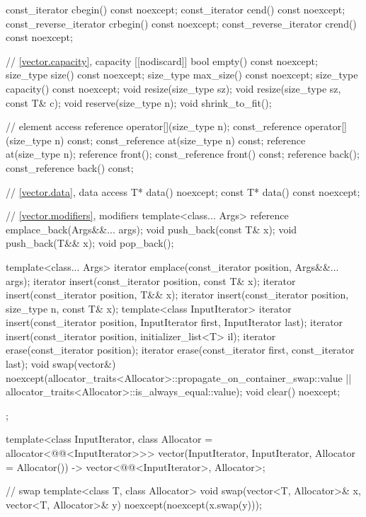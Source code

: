 \begin{codeblock}
{{    const_iterator         cbegin() const noexcept;
    const_iterator         cend() const noexcept;
    const_reverse_iterator crbegin() const noexcept;
    const_reverse_iterator crend() const noexcept;

    // \ref{vector.capacity}, capacity
    [[nodiscard]] bool empty() const noexcept;
    size_type size() const noexcept;
    size_type max_size() const noexcept;
    size_type capacity() const noexcept;
    void      resize(size_type sz);
    void      resize(size_type sz, const T& c);
    void      reserve(size_type n);
    void      shrink_to_fit();

    // element access
    reference       operator[](size_type n);
    const_reference operator[](size_type n) const;
    const_reference at(size_type n) const;
    reference       at(size_type n);
    reference       front();
    const_reference front() const;
    reference       back();
    const_reference back() const;

    // \ref{vector.data}, data access
    T*       data() noexcept;
    const T* data() const noexcept;

    // \ref{vector.modifiers}, modifiers
    template<class... Args> reference emplace_back(Args&&... args);
    void push_back(const T& x);
    void push_back(T&& x);
    void pop_back();

    template<class... Args> iterator emplace(const_iterator position, Args&&... args);
    iterator insert(const_iterator position, const T& x);
    iterator insert(const_iterator position, T&& x);
    iterator insert(const_iterator position, size_type n, const T& x);
    template<class InputIterator>
      iterator insert(const_iterator position, InputIterator first, InputIterator last);
    iterator insert(const_iterator position, initializer_list<T> il);
    iterator erase(const_iterator position);
    iterator erase(const_iterator first, const_iterator last);
    void     swap(vector&)
      noexcept(allocator_traits<Allocator>::propagate_on_container_swap::value ||
               allocator_traits<Allocator>::is_always_equal::value);
    void     clear() noexcept;
  };

  template<class InputIterator, class Allocator = allocator<@@<InputIterator>>>
    vector(InputIterator, InputIterator, Allocator = Allocator())
      -> vector<@@<InputIterator>, Allocator>;

  // swap
  template<class T, class Allocator>
    void swap(vector<T, Allocator>& x, vector<T, Allocator>& y)
      noexcept(noexcept(x.swap(y)));
}
\end{codeblock}%
%

